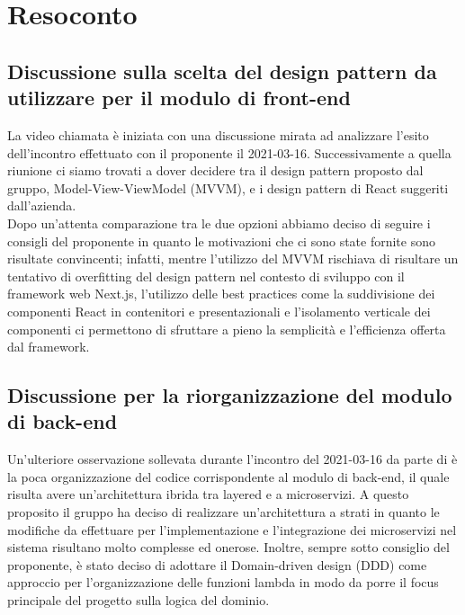 \section{Resoconto}
\subsection{Discussione sulla scelta del design pattern da utilizzare per il modulo di front-end}
La video chiamata è iniziata con una discussione mirata ad analizzare l'esito dell'incontro effettuato con il proponente \Proponente{} il 2021-03-16. Successivamente a quella riunione ci siamo trovati a dover decidere tra il design pattern proposto dal gruppo, Model-View-ViewModel (MVVM), e i design pattern di React suggeriti dall'azienda.\\
Dopo un'attenta comparazione tra le due opzioni abbiamo deciso di seguire i consigli del proponente in quanto le motivazioni che ci sono state fornite sono risultate convincenti; infatti, mentre l'utilizzo del MVVM rischiava di risultare un tentativo di overfitting del design pattern nel contesto di sviluppo con il framework web Next.js, l'utilizzo delle best practices come la suddivisione dei componenti React in contenitori e presentazionali e l'isolamento verticale dei componenti ci permettono di sfruttare a pieno la semplicità e l'efficienza offerta dal framework.
\subsection{Discussione per la riorganizzazione del modulo di back-end}
Un'ulteriore osservazione sollevata durante l'incontro del 2021-03-16 da parte di \Proponente{} è la poca organizzazione del codice corrispondente al modulo di back-end, il quale risulta avere un'architettura ibrida tra layered e a microservizi. A questo proposito il gruppo ha deciso di realizzare un'architettura a strati in quanto le modifiche da effettuare per l'implementazione e l'integrazione dei microservizi nel sistema risultano molto complesse ed onerose. Inoltre, sempre sotto consiglio del proponente, è stato deciso di adottare il Domain-driven design (DDD) come approccio per l'organizzazione delle funzioni lambda in modo da porre il focus principale del progetto sulla logica del dominio.